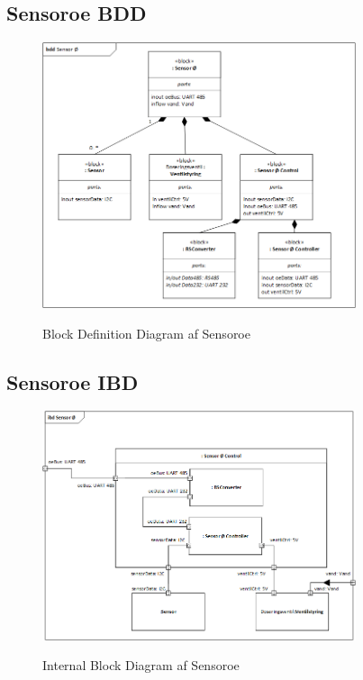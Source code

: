 
\subsection{Sensoroe BDD}

\begin{figure}[H]
	\centering
	\includegraphics[width=0.82\textwidth]{Systemarkitektur/Sensoroe/Sensoroe_BDD.png}
	\label{fig:Sensoroe BDD}
	\caption{Block Definition Diagram af Sensoroe}
\end{figure}



\subsection{Sensoroe IBD}

\begin{figure}[H]
	\centering
	\includegraphics[width=0.82\textwidth]{Systemarkitektur/Sensoroe/Sensoroe_IBD.png}
	\label{fig:Sensoroe BDD}
	\caption{Internal Block Diagram af Sensoroe}
\end{figure}




